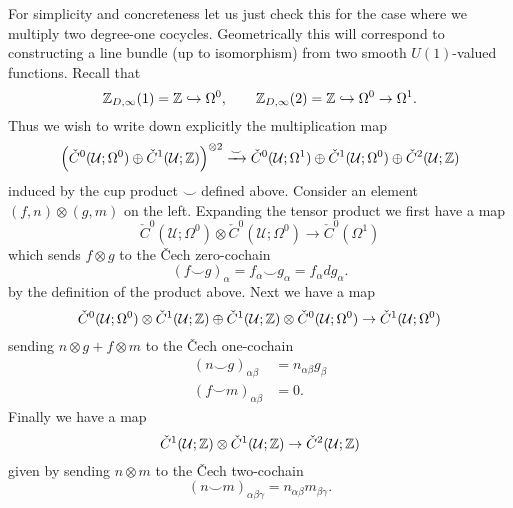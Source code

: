 \documentclass{amsart}
\begin{document}
For simplicity and concreteness let us just check this for the case where
we multiply two degree-one cocycles. Geometrically this will correspond to
constructing a line bundle (up to isomorphism) from two smooth $U(1)$-valued functions.
Recall that
\begin{equation*}
    \mathbb{Z}_{D,\infty}(1) = \mathbb{Z} \hookrightarrow \Omega^0, \qquad \mathbb{Z}_{D,\infty}(2) = \mathbb{Z}\hookrightarrow \Omega^0 \to \Omega^1.
\end{equation*}
Thus we wish to write down explicitly the multiplication map
\begin{equation*}
    \left(\check C^0(\mathcal{U};\Omega^0) \oplus \check C^1(\mathcal{U};\mathbb{Z})\right)^{\otimes 2} \xrightarrow{\smile}
    \check C^0(\mathcal{U};\Omega^1) \oplus \check C^1(\mathcal{U};\Omega^0) \oplus \check C^2(\mathcal{U};\mathbb{Z})
\end{equation*}
induced by the cup product $\smile$ defined above. Consider an element $(f,n)\otimes(g,m)$
on the left. Expanding the tensor product we first have a map
\begin{equation*}
    \check C^0(\mathcal{U};\Omega^0) \otimes\check C^0(\mathcal{U};\Omega^0) \to \check C^0(\Omega^1)
\end{equation*}
which sends $f\otimes g$ to the \v Cech zero-cochain
\begin{equation*}
    (f\smile g)_\alpha = f_\alpha \smile g_\alpha = f_\alpha dg_\alpha.
\end{equation*}
by the definition of the product above. Next we have a map
\begin{equation*}
    \check C^0(\mathcal{U};\Omega^0) \otimes \check C^1(\mathcal{U};\mathbb{Z}) \oplus
    \check C^1(\mathcal{U};\mathbb{Z})\otimes \check C^0(\mathcal{U};\Omega^0) \to
    \check C^1(\mathcal{U};\Omega^0)
\end{equation*}
sending $n\otimes g+f\otimes m$ to the \v Cech one-cochain
\begin{align*}
    (n\smile g)_{\alpha\beta} &= n_{\alpha\beta}g_\beta \\
    (f\smile m)_{\alpha\beta} &= 0.
\end{align*}
Finally we have a map
\begin{equation*}
    \check C^1(\mathcal{U};\mathbb{Z})\otimes \check C^1(\mathcal{U};\mathbb{Z}) \to \check C^2(\mathcal{U}; \mathbb{Z})
\end{equation*}
given by sending $n\otimes m$ to the \v Cech two-cochain
\begin{equation*}
    (n\smile m)_{\alpha\beta\gamma} = n_{\alpha\beta}m_{\beta\gamma}.
\end{equation*}
\end{document}
